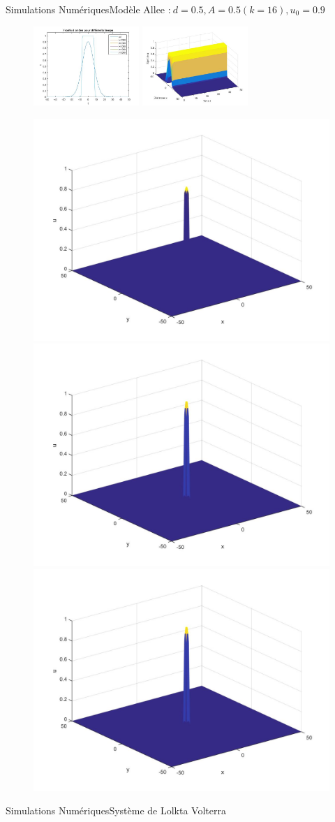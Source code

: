 \documentclass[10pt]{beamer}
\begin{document}
\begin{frame}{Simulations Numériques}{Modèle Allee :$\ d=0.5, A=0.5 (k=16), u_0=0.9$}
\begin{figure}[H]
	\centering
	\includegraphics[width=0.40\linewidth, height=3cm]{Allee/F2333}\hfill
	\includegraphics[width=0.55\linewidth, height=3cm]{Allee/F4333}
\end{figure}
\begin{figure}[H]
	\centering
	\includegraphics[width=0.3\linewidth]{Allee/333__1_}\hfill
    \includegraphics[width=0.3\linewidth]{Allee/333__2_}\hfill
	\includegraphics[width=0.3\linewidth]{Allee/333__3_}
\end{figure}
\end{frame}

\begin{frame}{Simulations Numériques}{Système de Lolkta Volterra}
\end{frame}
\end{document}
